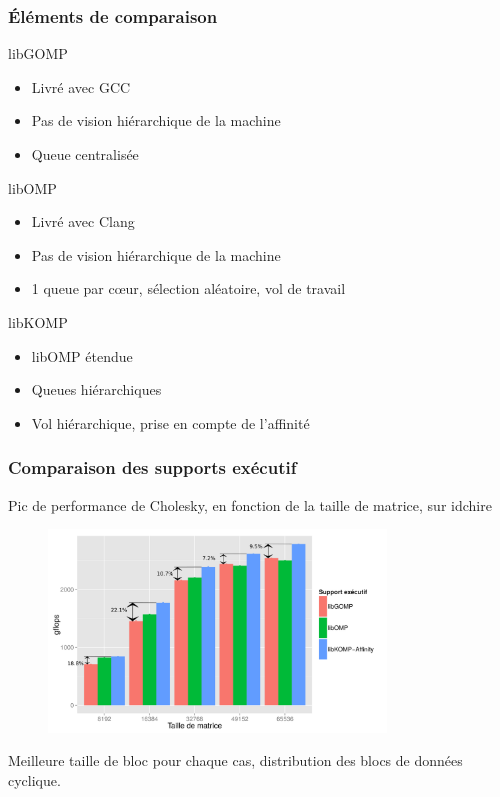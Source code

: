 \documentclass[xcolor={usenames,dvipsnames,svgnames,table}, aspectratio=43]{beamer}
\begin{document}
\begin{frame}
  \frametitle{Éléments de comparaison}

  \begin{block}{libGOMP}
    \begin{itemize}
      \item Livré avec GCC
      \item Pas de vision hiérarchique de la machine
      \item Queue centralisée
    \end{itemize}
  \end{block}

  \begin{block}{libOMP}
    \begin{itemize}
      \item Livré avec Clang
      \item Pas de vision hiérarchique de la machine
      \item 1 queue par cœur, sélection aléatoire, vol de travail
    \end{itemize}
  \end{block}

  \begin{block}{libKOMP}
    \begin{itemize}
      \item libOMP étendue
      \item Queues hiérarchiques
      \item Vol hiérarchique, prise en compte de l'affinité
    \end{itemize}
  \end{block}

\end{frame}




\begin{frame}
  \frametitle{Comparaison des supports exécutif}
  Pic de performance de Cholesky, en fonction de la taille de matrice, sur idchire
  \begin{figure}
    \includegraphics[width=0.8\textwidth]{graph/graph_details_cholesky_idchire.pdf}
  \end{figure}
  Meilleure taille de bloc pour chaque cas, distribution des blocs de données cyclique.
\end{frame}
\end{document}

